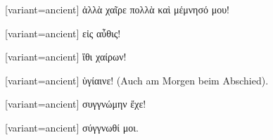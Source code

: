 \switchcolumn

\begin{greek}[variant=ancient]%
ἀλλὰ χαῖρε πολλὰ καὶ μέμνησό μου!

\end{greek}%
\switchcolumn*

%
%

\switchcolumn

\begin{greek}[variant=ancient]%
εἰς αὖθις!

\end{greek}%
\switchcolumn*

%
%

\switchcolumn

\begin{greek}[variant=ancient]%
ἴθι χαίρων!

\end{greek}%
\switchcolumn*

%
%

\switchcolumn

\begin{greek}[variant=ancient]%
ὑγίαινε!\textgerman[spelling=old,babelshorthands=true]{ (Auch am Morgen
beim Abschied).}

\end{greek}%
\indent
{}%
%

\switchcolumn

\begin{greek}[variant=ancient]%
συγγνώμην ἔχε!

\end{greek}%
\switchcolumn*

%
%

\switchcolumn

\begin{greek}[variant=ancient]%
σύγγνωθί μοι.

\end{greek}%
\switchcolumn*

%
%


